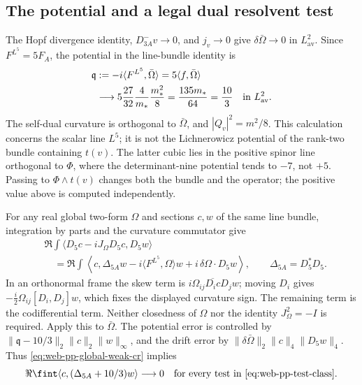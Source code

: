 \subsection{The potential and a legal dual resolvent test}

The Hopf divergence identity, \(D^-_{3A}v\to0\), and \(j_v\to0\)
give \(\delta\bar\Omega\to0\) in \(L^2_{\mathrm{av}}\).
Since \(F^{L^5}=5F_A\), the potential in the line-bundle identity is
\begin{equation}
 \begin{split}
 \mathfrak q&:=-i\langle F^{L^5},\bar\Omega\rangle
       =5\langle f,\bar\Omega\rangle\\
 &\longrightarrow
 5\frac{27}{32}\frac4{m_*}\frac{m_*^2}{8}
       =\frac{135m_*}{64}=\frac{10}{3}
       \quad\hbox{in }L^2_{\mathrm{av}}.
 \end{split}
 \label{eq:web-pp-positive-potential}
\end{equation}
The self-dual curvature is orthogonal to \(\bar\Omega\), and
\(|Q_v|^2=m^2/8\).  This calculation concerns the scalar line \(L^5\);
it is not the Lichnerowicz potential of the rank-two bundle containing
\(t(v)\).  The latter cubic lies in the positive spinor line orthogonal
to \(\Phi\), where the determinant-nine potential tends to \(-7\),
not \(+5\).  Passing to \(\Phi\wedge t(v)\) changes both the bundle
and the operator; the positive value above is computed independently.

For any real global two-form \(\Omega\) and sections \(c,w\) of the
same line bundle, integration by parts and the curvature commutator give
\begin{equation}
 \begin{split}
 &\Re\int\langle D_5c-iJ_\Omega D_5c,D_5w\rangle\\
 &\quad=\Re\int\left\langle c,
   \Delta_{5A}w-i\langle F^{L^5},\Omega\rangle w
                    +i\,\delta\Omega\mathbin{\cdot}D_5w\right\rangle,
 \qquad\Delta_{5A}=D_5^*D_5.
 \end{split}
 \label{eq:web-pp-line-pairing}
\end{equation}
In an orthonormal frame the skew term is
\(i\Omega_{ij}\overline{D_ic}D_jw\); moving \(D_i\) gives
\(-\tfrac i2\Omega_{ij}[D_i,D_j]w\), which fixes the displayed
curvature sign.  The remaining term is the codifferential term.  Neither
closedness of \(\Omega\) nor the identity \(J_\Omega^2=-I\) is required.
Apply this to \(\bar\Omega\).  The potential error is controlled by
\(\|\mathfrak q-10/3\|_2\|c\|_2\|w\|_\infty\), and the drift
error by \(\|\delta\bar\Omega\|_2\|c\|_4\|D_5w\|_4\).
Thus \eqref{eq:web-pp-global-weak-cr} implies
\begin{equation}
 \Re\fint\langle c,(\Delta_{5A}+10/3)w\rangle\longrightarrow0
 \quad\hbox{for every test in \eqref{eq:web-pp-test-class}}.
 \label{eq:web-pp-weak-positive-equation}
\end{equation}

